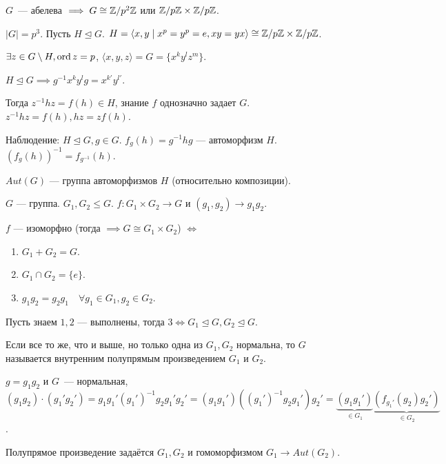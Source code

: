 \begin{remark}
    $G$~--- абелева $\implies G \cong \mathbb{Z} / p^2 \mathbb{Z}$ или $\mathbb{Z} / p \mathbb{Z} \times \mathbb{Z} / p \mathbb{Z}$.
\end{remark}
\begin{example}
    $|G| = p^3$.
    Пусть $H \trianglelefteq G$.  $H = \langle x, y \mid x^p = y^p = e, xy=yx\rangle \cong \mathbb{Z} / p\mathbb{Z} \times \mathbb{Z} / p\mathbb{Z}$.

     $\exists z \in G \setminus H, \operatorname{ord} z = p$, $\langle x, y, z\rangle = G = \{ x^k y^l z^m \}$.  

     $H \trianglelefteq G \implies g^{-1}x^{k}y^{l}g = x^{k'}y^{l'}$.

     Тогда $z^{-1}hz = f(h) \in H$, знание  $f$ однозначно задает  $G$.  $z^{-1}hz = f(h), hz = zf(h)$.

     Наблюдение: $H \trianglelefteq G, g \in G$.  $f_g(h) = g^{-1}hg$ --- автоморфизм  $H$. $(f_g(h))^{-1} = f_{g^{-1}}(h)$.
\end{example}
\begin{definition}
    $Aut(G)$ --- группа автоморфизмов  $H$ (относительно композиции).
\end{definition}
\begin{statement}
    $G$ --- группа.  $G_1, G_2 \le G$. $f\!: G_1 \times G_2 \to G$ и $(g_1,g_2) \to g_1g_2$.

    $f$ --- изоморфно (тогда $\implies G \cong G_1 \times G_2$) $\iff$
    \begin{enumerate}
        \item $G_1+G_2 = G$.
        \item $G_1 \cap G_2 = \{e\}$.
        \item $g_1g_2 = g_2g_1\quad \forall g_1 \in G_1, g_2 \in G_2$.
    \end{enumerate}
\end{statement}
\begin{exerc}
    Пусть знаем $1, 2$ --- выполнены, тогда  $3 \iff G_1 \trianglelefteq G, G_2 \trianglelefteq G$.
\end{exerc}
\begin{definition}
    Если все то же, что и выше, но только одна из $G_1, G_2$ нормальна, то $G$ называется внутренним полупрямым произведением  $G_1$ и $G_2$.

    $g = g_1g_2$ и $G$~--- нормальная, $(g_1g_2) \cdot (g_1' g_2') = g_1g_1'(g_1')^{-1}g_2g_1'g_2' = (g_1g_1')((g_1')^{-1}g_2g_1')g_2' = \underbrace{(g_1g_1')}_{\in G_1}\underbrace{(f_{g_1'}(g_2)g_2')}_{\in G_2}$.

    Полупрямое произведение задаётся $G_1, G_2$ и гомоморфизмом $G_1 \to Aut(G_2)$.
\end{definition}
